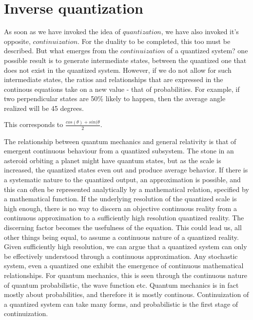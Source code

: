 \documentclass[notitlepage]{report}
\begin{document}
\section*{Inverse quantization}
As soon as we have invoked the idea of $quantization$, we have also invoked it's opposite, $continuization$. For the duality to be completed, this too must be described. But what emerges from the $continuization$ of a quantized system? one possible result is to generate intermediate states, between the quantized one that does not exist in the quantized system. However, if we do not allow for such intermediate states, the ratios and relationships that are expressed in the continous equations take on a new value - that of probabilities. For example, if two perpendicular states are 50\% likely to happen, then the average angle realized will be 45 degrees. 

This corresponds to $\frac{cos(\theta) + sin(\theta}{2}$.


The relationship between quantum mechanics and general relativity is that of emergent continuous behaviour from a quantized subsystem. The stone in an asteroid orbiting a planet might have quantum states, but as the scale is increased, the quantized states even out and produce average behavior. If there is a systematic nature to the quantized output, an approximation is possible, and this can often be represented analytically by a mathematical relation, specified by a mathematical function. If the underlying resolution of the quantized scale is high enough, there is no way to discern an objective continuous reality from a continuous approximation to a sufficiently high resolution quantized reality. The discerning factor becomes the usefulness of the equation. This could lead us, all other things being equal, to assume a continuous nature of a quantized reality. Given sufficiently high resolution, we can argue that a quantized system can only be effectively understood through a continuous approximation. Any stochastic system, even a quantized one exhibit the emergence of continuous mathematical relationships. For quantum mechanics, this is seen through the continuous nature of quantum probabilistic, the wave function etc. Quantum mechanics is in fact mostly about probabilities, and therefore it is mostly continous. Continuization of a quantized system can take many forms, and probabilistic is the first stage of continuization.
\end{document}
